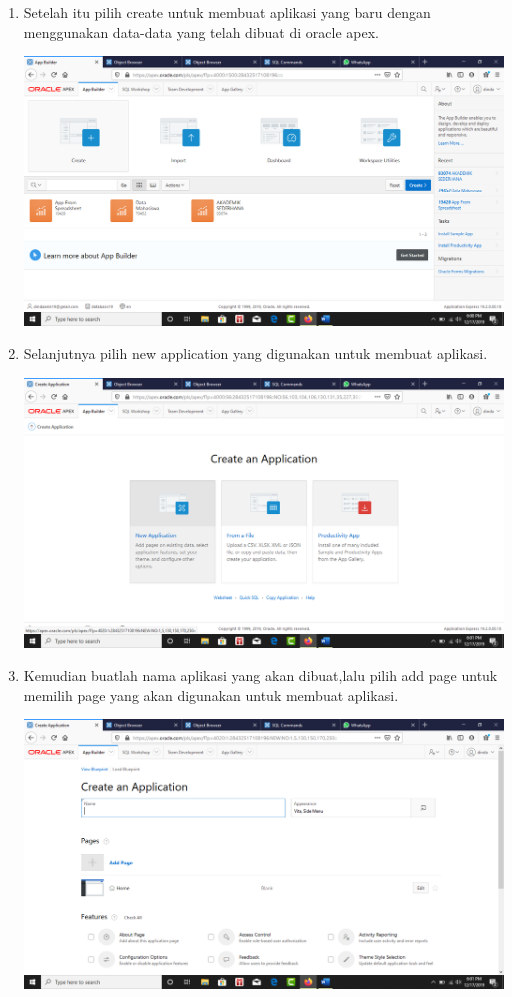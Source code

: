 \begin{enumerate}
    \item Setelah itu pilih create untuk membuat aplikasi yang baru dengan menggunakan data-data yang telah dibuat di oracle apex.
     \begin{center}
    \includegraphics[width=10cm\textwidth]{gambar/19.png}
    \end{center}
    \item Selanjutnya pilih new application yang digunakan untuk membuat aplikasi.
     \begin{center}
    \includegraphics[width=10cm\textwidth]{gambar/20.png}
    \end{center}
    \item Kemudian buatlah nama aplikasi yang akan dibuat,lalu pilih add page untuk memilih page yang akan digunakan untuk membuat aplikasi.
     \begin{center}
    \includegraphics[width=10cm\textwidth]{gambar/21.png}

\end{center}
\end{enumerate}
